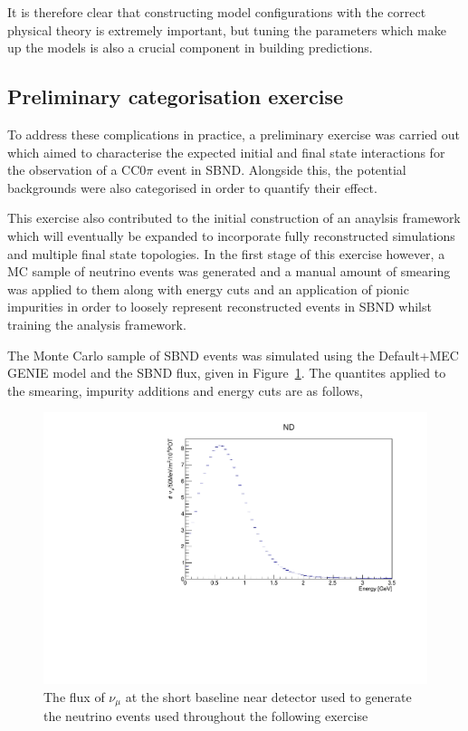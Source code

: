 It is therefore clear that constructing model configurations with the correct physical theory is extremely important, but tuning the parameters which make up the models is also a crucial component in building predictions.

\subsection{Preliminary categorisation exercise}

To address these complications in practice, a preliminary exercise was carried out which aimed to characterise the expected initial and final state interactions for the observation of a CC0\(\pi\) event in SBND. Alongside this, the potential backgrounds were also categorised in order to quantify their effect. 

    This exercise also contributed to the initial construction of an anaylsis framework which will eventually be expanded to incorporate fully reconstructed simulations and multiple final state topologies. In the first stage of this exercise however, a MC sample of neutrino events was generated and a manual amount of smearing was applied to them along with energy cuts and an application of pionic impurities in order to loosely represent reconstructed events in SBND whilst training the analysis framework.  

The Monte Carlo sample of SBND events was simulated using the Default+MEC GENIE model and the SBND flux, given in Figure~\ref{fig:SBNDFlux}. The quantites applied to the smearing, impurity additions and energy cuts are as follows, 

    \begin{figure}[h!]
        \centering
        \includegraphics[width=.8\textwidth, trim=0 0 0 1cm, clip]{images/sbnd_flux.pdf}
        \caption{The flux of \(\nu_{\mu}\) at the short baseline near detector used to generate the neutrino events used throughout the following exercise}
        \label{fig:SBNDFlux}
    \end{figure}

